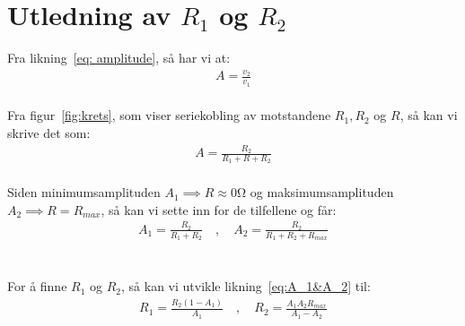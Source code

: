 \documentclass[a4paper,11pt,norsk]{article}
\newcommand{\comma}{\quad , \quad}
\def\spliteq#1{\begin{equation}\begin{split}{#1}\end{split}\end{equation}\\}
\begin{document}
\appendix
\section{Utledning av $R_1$ og $R_2$}\label{attach:resistors}

Fra likning~\ref{eq: amplitude}, så har vi at:
\spliteq {
    A = \frac{v_2}{v_1}
}
Fra figur~\ref{fig:krets}, som viser seriekobling av motstandene $R_1, R_2$ og $R$, så kan vi skrive det som:
\spliteq {
    A = \frac{R_2}{R_1 + R  + R_2}
}

Siden minimumsamplituden $A_1 \implies R \approx 0 \mathrm{\Omega}$ og maksimumsamplituden $A_2 \implies R = R_{max}$, så kan vi sette inn for de tilfellene og får:
\spliteq {
    A_1 = \frac{R_2}{R_1+R_2}\comma
    A_2 = \frac{R_2}{R_1+R_2+R_{max}}
    \label{eq:A_1&A_2}
}\\
For å finne $R_1$ og $R_2$, så kan vi utvikle likning~\ref{eq:A_1&A_2} til:
\spliteq {
    R_1 = \frac{R_2(1-A_1)}{A_1} \comma
    R_2 = \frac{A_1A_2R_{max}}{A_1-A_2}
}
\end{document}
